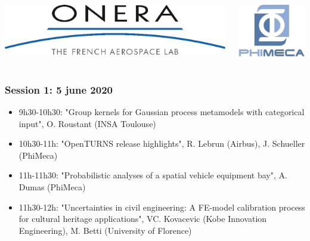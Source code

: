 \documentclass{beamer}
\begin{document}
\begin{frame}
\begin{columns}
  \begin{center}
\includegraphics[height=0.05\textheight]{figures/onera-logo.png}
\end{center}

  \begin{center}
\includegraphics[height=0.08\textheight]{figures/logo-phimeca.png}
\end{center}


  \end{columns}

  \end{frame}

\begin{frame}
\frametitle{Session 1: 5 june 2020}


% 
\begin{itemize}
\item 9h30-10h30: "Group kernels for Gaussian process metamodels with categorical input", O. Roustant (INSA Toulouse)
\item 10h30-11h: "OpenTURNS release highlights", R. Lebrun (Airbus), J. Schueller (PhiMeca)
\item 11h-11h30: "Probabilistic analyses of a spatial vehicle equipment bay", A. Dumas (PhiMeca)
\item 11h30-12h: "Uncertainties in civil engineering: A FE-model calibration process for cultural heritage applications", VC. Kovacevic (Kobe Innovation Engineering), M. Betti (University of Florence)
\end{itemize}



\end{frame}
\end{document}
